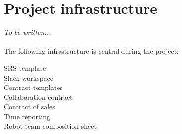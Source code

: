 \documentclass{scrreprt}
\begin{document}
\section{Project infrastructure}
\emph{To be written...}\\\\
The following infrastructure is central during the project:

\begin{description}
\item[SRS template]
\item[Slack workspace]
\item[Contract templates]
\item[Collaboration contract]
\item[Contract of sales]
\item[Time reporting]
\item[Robot team composition sheet]
\end{description}
\end{document}
